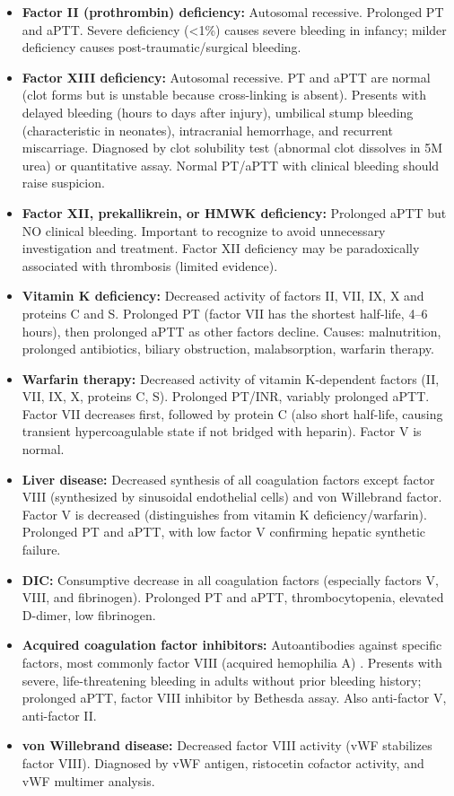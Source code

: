 \begin{itemize}
  \item \textbf{Factor II (prothrombin) deficiency:} Autosomal recessive. Prolonged PT and aPTT. Severe deficiency (<1\%) causes severe bleeding in infancy; milder deficiency causes post-traumatic/surgical bleeding.
  \item \textbf{Factor XIII deficiency:} Autosomal recessive. PT and aPTT are normal (clot forms but is unstable because cross-linking is absent). Presents with delayed bleeding (hours to days after injury), umbilical stump bleeding (characteristic in neonates), intracranial hemorrhage, and recurrent miscarriage. Diagnosed by clot solubility test (abnormal clot dissolves in 5M urea) or quantitative assay. Normal PT/aPTT with clinical bleeding should raise suspicion.
  \item \textbf{Factor XII, prekallikrein, or HMWK deficiency:} Prolonged aPTT but NO clinical bleeding. Important to recognize to avoid unnecessary investigation and treatment. Factor XII deficiency may be paradoxically associated with thrombosis (limited evidence).
  \item \textbf{Vitamin K deficiency:} Decreased activity of factors II, VII, IX, X and proteins C and S. Prolonged PT (factor VII has the shortest half-life, 4--6 hours), then prolonged aPTT as other factors decline. Causes: malnutrition, prolonged antibiotics, biliary obstruction, malabsorption, warfarin therapy.
  \item \textbf{Warfarin therapy:} Decreased activity of vitamin K-dependent factors (II, VII, IX, X, proteins C, S). Prolonged PT/INR, variably prolonged aPTT. Factor VII decreases first, followed by protein C (also short half-life, causing transient hypercoagulable state if not bridged with heparin). Factor V is normal.
  \item \textbf{Liver disease:} Decreased synthesis of all coagulation factors except factor VIII (synthesized by sinusoidal endothelial cells) and von Willebrand factor. Factor V is decreased (distinguishes from vitamin K deficiency/warfarin). Prolonged PT and aPTT, with low factor V confirming hepatic synthetic failure.
  \item \textbf{DIC:} Consumptive decrease in all coagulation factors (especially factors V, VIII, and fibrinogen). Prolonged PT and aPTT, thrombocytopenia, elevated D-dimer, low fibrinogen.
  \item \textbf{Acquired coagulation factor inhibitors:} Autoantibodies against specific factors, most commonly factor VIII (acquired hemophilia A) \cite{tripodi2006acquired}. Presents with severe, life-threatening bleeding in adults without prior bleeding history; prolonged aPTT, factor VIII inhibitor by Bethesda assay. Also anti-factor V, anti-factor II.
  \item \textbf{von Willebrand disease:} Decreased factor VIII activity (vWF stabilizes factor VIII). Diagnosed by vWF antigen, ristocetin cofactor activity, and vWF multimer analysis.
\end{itemize}

